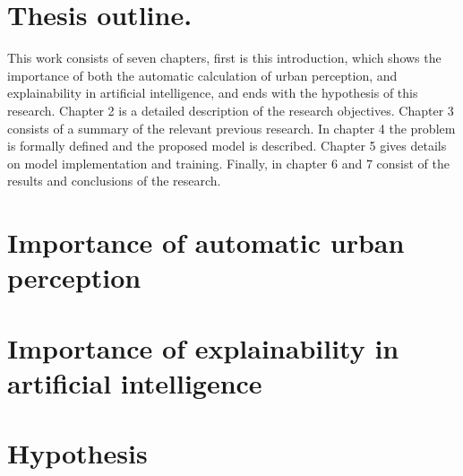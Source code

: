 \section{Thesis outline.}
This work consists of seven chapters, first is this introduction, which
shows the  importance of both the automatic calculation of urban perception, and
explainability in artificial intelligence, and ends with the hypothesis
of this research. Chapter 2 is a detailed description of the research objectives.
Chapter 3 consists of a summary of the relevant previous research. In chapter 4
the problem is formally defined and the proposed model is described. Chapter 5 gives
details on model implementation and training. Finally, in chapter 6 and 7 consist of the results and
conclusions of the research.

\section{Importance of automatic urban perception}

\section{Importance of explainability in artificial intelligence}

\section{Hypothesis}